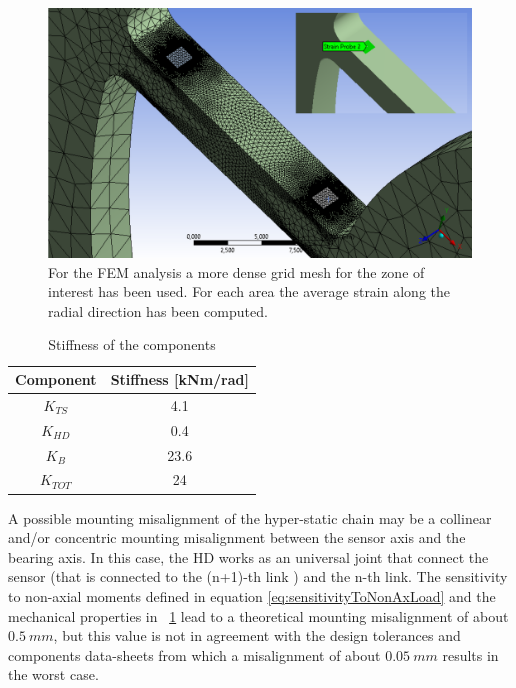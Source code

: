 \documentclass[journal]{IEEEtran}
\begin{document}
%
\begin{figure}[]
	\centering
	\includegraphics[width=0.7\columnwidth]{strainGaugeDeformation} 
	\caption{For the FEM analysis a more dense grid mesh for the zone of interest has been used. For each area the average strain along the radial direction has been computed.}
	\label{fig:strainGaugeDeformation}
\end{figure}
%
\begin{table}[]
	\renewcommand{\arraystretch}{1.3}
	\caption{Stiffness of the components}
	\label{tab:nonAxialStiffness}
	\centering
	\begin{tabular}{c c}
		\hline \hline
		\bfseries Component & \bfseries Stiffness [kNm/rad]\\
		\hline
		$K_{TS}$  & 4.1\\
		$K_{HD}$  & 0.4\\
		$K_{B}$   & 23.6\\
		\hline
		$K_{TOT}$   & 24\\
		\hline \hline
	\end{tabular}
\end{table}
%
%
\par A possible mounting misalignment of the hyper-static chain may be a collinear and/or concentric mounting misalignment between the sensor axis and the bearing axis. In this case, the HD works as an universal joint that connect the sensor (that is connected to the (n+1)-th link ) and the n-th link. The sensitivity to non-axial moments defined in equation \eqref{eq:sensitivityToNonAxLoad} and  the mechanical properties  in \tablename \ \ref{tab:nonAxialStiffness} lead to a theoretical mounting misalignment of about $0.5 \ mm$, but this value is not in agreement with the design tolerances and components data-sheets from which a misalignment of about $0.05 \ mm$ results in the worst case.
%
\end{document}
